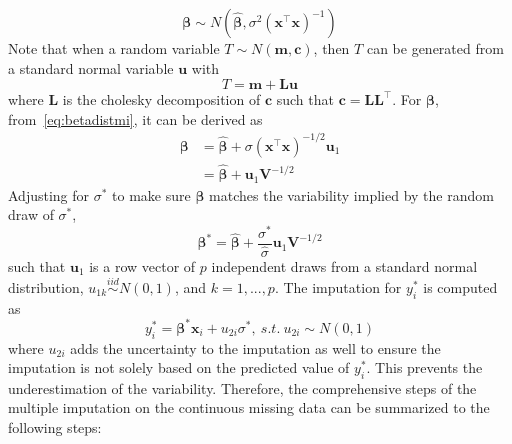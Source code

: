 \documentclass[preprint,12pt]{elsarticle}
\begin{document}
\begin{equation}\label{eq:betadistmi}
    \boldsymbol{\beta}\sim N(\hat{\boldsymbol{\beta}}, \sigma^2(\mathbf{x}^{\top}\mathbf{x})^{-1})
\end{equation}
Note that when a random variable $T\sim N(\mathbf{m}, \mathbf{c})$, then $T$ can be generated from a standard normal variable $\mathbf{u}$ with 
\begin{equation} 
    T=\mathbf{m}+\mathbf{L}\mathbf{u}
\end{equation}
where $\mathbf{L}$ is the cholesky decomposition of $\mathbf{c}$ such that $\mathbf{c}=\mathbf{L}\mathbf{L}^{\top}$.
For $\boldsymbol{\beta}$, from~\ref{eq:betadistmi}, it can be derived as 
\begin{align} 
    \boldsymbol{\beta}&=\hat{\boldsymbol{\beta}}+\sigma (\mathbf{x}^{\top}\mathbf{x})^{-1/2}\mathbf{u}_1\\
    &=\hat{\boldsymbol{\beta}}+\mathbf{u}_1\mathbf{V}^{-1/2}
\end{align}
Adjusting for $\sigma^*$ to make sure $\boldsymbol{\beta}$ matches the variability implied by the random draw of $\sigma^*$, 
\begin{equation} 
    \boldsymbol{\beta}^*=\hat{\boldsymbol{\beta}}+\frac{\sigma^*}{\hat{\sigma}}\mathbf{u}_1\mathbf{V}^{-1/2}
\end{equation}
such that $\mathbf{u}_1$ is a row vector of $p$ independent draws from a standard normal distribution, $u_{1k}\stackrel{iid}{\sim} N(0,1)$, and $k=1,...,p$. 
The imputation for $y_i^*$ is computed as 
\begin{equation} 
    y_i^*=\boldsymbol{\beta}^*\mathbf{x}_i+u_{2i}\sigma^*,~ s.t.~ u_{2i}\sim N(0,1)
\end{equation}
where $u_{2i}$ adds the uncertainty to the imputation as well to ensure the imputation is not solely based on the predicted value of $y_i^*$. 
This prevents the underestimation of the variability. 
Therefore, the comprehensive steps of the multiple imputation on the continuous missing data can be summarized to the following steps: 
\end{document}
